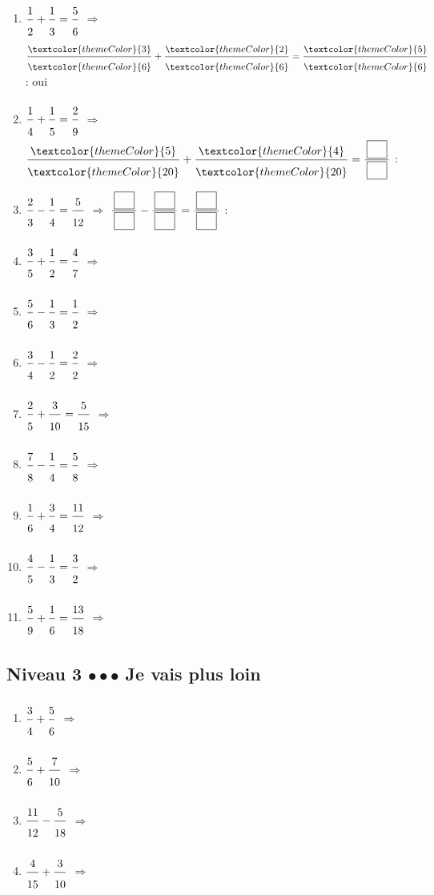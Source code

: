 \begin{enumerate}[leftmargin=*,align=parleft, label=\alph*), itemsep=9pt]
\item $\FA{1}{2}+\FA{1}{3}=\FA{5}{6}$ \quad $\Longrightarrow$ \quad $\FA{\textcolor{themeColor}{3}}{\textcolor{themeColor}{6}}+\FA{\textcolor{themeColor}{2}}{\textcolor{themeColor}{6}}=\FA{\textcolor{themeColor}{5}}{\textcolor{themeColor}{6}}$ \quad : \quad \textcolor{themeColor}{oui}
\item $\FA{1}{4}+\FA{1}{5}=\FA{2}{9}$ \quad $\Longrightarrow$ \quad $\FA{\textcolor{themeColor}{5}}{\textcolor{themeColor}{20}}+\FA{\textcolor{themeColor}{4}}{\textcolor{themeColor}{20}}=\FA{\CaseC}{\CaseC}$ \quad : \quad \Case
\item $\FA{2}{3}-\FA{1}{4}=\FA{5}{12}$ \quad $\Longrightarrow$ \quad $\FA{\CaseC}{\CaseC}-\FA{\CaseC}{\CaseC}=\FA{\CaseC}{\CaseC}$ \quad : \quad \Case
\item $\FA{3}{5}+\FA{1}{2}=\FA{4}{7}$ \quad $\Longrightarrow$
\item $\FA{5}{6}-\FA{1}{3}=\FA{1}{2}$ \quad $\Longrightarrow$
\item $\FA{3}{4}-\FA{1}{2}=\FA{2}{2}$ \quad $\Longrightarrow$
\item $\FA{2}{5}+\FA{3}{10}=\FA{5}{15}$ \quad $\Longrightarrow$
\item $\FA{7}{8}-\FA{1}{4}=\FA{5}{8}$ \quad $\Longrightarrow$
\item $\FA{1}{6}+\FA{3}{4}=\FA{11}{12}$ \quad $\Longrightarrow$
\item $\FA{4}{5}-\FA{1}{3}=\FA{3}{2}$ \quad $\Longrightarrow$
\item $\FA{5}{9}+\FA{1}{6}=\FA{13}{18}$ \quad $\Longrightarrow$
\end{enumerate}
 
\newpage
\subsection{Niveau 3 \quad $\bullet\bullet\bullet$ \quad Je vais plus loin}
 
 
\begin{enumerate}[leftmargin=*,align=parleft, label=\alph*), itemsep=9pt]
\item $\FA{3}{4}+\FA{5}{6}$ \quad $\Longrightarrow$
\item $\FA{5}{6}+\FA{7}{10}$ \quad $\Longrightarrow$
\item $\FA{11}{12}-\FA{5}{18}$ \quad $\Longrightarrow$
\item $\FA{4}{15}+\FA{3}{10}$ \quad $\Longrightarrow$
\end{enumerate}
 
